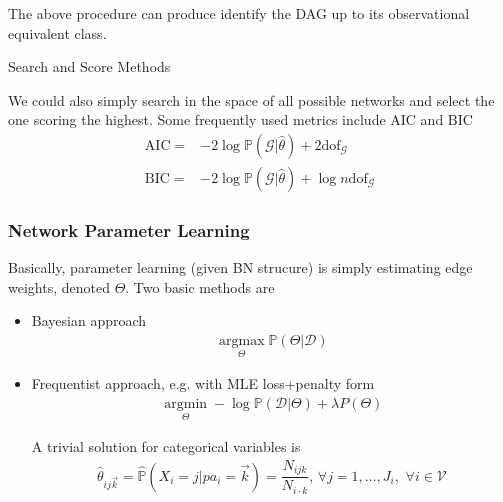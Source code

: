The above procedure can produce identify the DAG up to its observational equivalent class.




\begin{point}
    Search and Score Methods
\end{point}

We could also simply search in the space of all possible networks and select the one scoring the highest. Some frequently used metrics include AIC and BIC
\begin{align}
    \mathrm{AIC}=&-2\log \mathbb{P}\left( \mathcal{G}|\hat{\theta }  \right) + 2\mathrm{dof}_\mathcal{G} \\
    \mathrm{BIC}=&-2\log \mathbb{P}\left( \mathcal{G}|\hat{\theta } \right) +\log n \mathrm{dof}_\mathcal{G}   
\end{align}



\subsubsection{Network Parameter Learning}
Basically, parameter learning (given BN strucure) is simply estimating edge weights, denoted $ \varTheta $. Two basic methods are 
\begin{itemize}[topsep=2pt,itemsep=0pt]
    \item Bayesian approach
    \begin{align}
        \mathop{\arg\max}\limits_{\varTheta}\mathbb{P}(\varTheta|\mathcal{D})  
    \end{align}
    \item Frequentist approach, e.g. with MLE loss+penalty form
    \begin{align}
         \mathop{\arg\min}\limits_{\varTheta}-\log\mathbb{P}\left( \mathcal{D}|\varTheta \right) + \lambda P(\varTheta)  
    \end{align}

    A trivial solution for categorical variables is 
    \begin{align}
        \hat{\theta}_{ij\vec{k}}=\hat{\mathbb{P}}(X_i=j|pa_{i}=\vec{k})=\dfrac{N_{ijk}}{N_{i\cdot k}},\,\forall j=1,\ldots,J_{i} ,\,\,\forall i\in\mathcal{V}
    \end{align}
    
    
\end{itemize}

    
